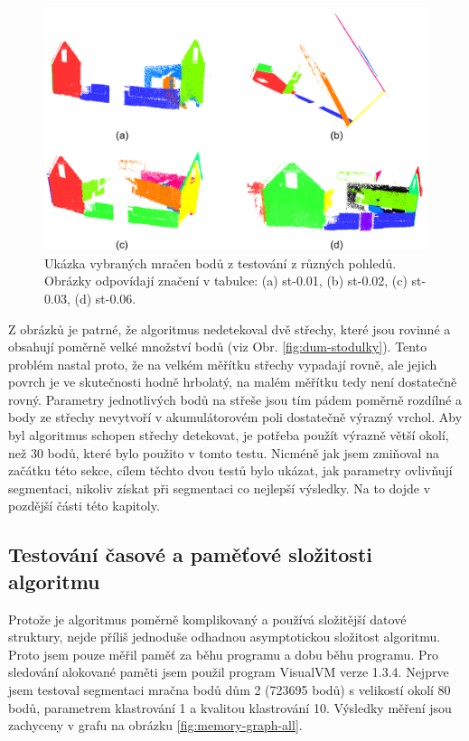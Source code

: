 \documentclass[11pt,twoside,a4paper]{book}
\begin{document}
\begin{figure}[ht]
\begin{center}
\includegraphics[width=\textwidth]{figures/test-stodulky-seg}
\caption{Ukázka vybraných mračen bodů z testování z různých pohledů. Obrázky odpovídají značení v tabulce: (a) st-0.01, (b) st-0.02, (c) st-0.03, (d) st-0.06.}
\label{fig:test-stodulky-seg}
\end{center}
\end{figure}

Z obrázků je patrné, že algoritmus nedetekoval dvě střechy, které jsou rovinné a obsahují poměrně velké množství bodů (viz Obr. \ref{fig:dum-stodulky}). Tento problém nastal proto, že na velkém měřítku střechy vypadají rovně, ale jejich povrch je ve skutečnosti hodně hrbolatý, na malém měřítku tedy není dostatečně rovný. Parametry jednotlivých bodů na střeše jsou tím pádem poměrně rozdílné a body ze střechy nevytvoří v akumulátorovém poli dostatečně výrazný vrchol. Aby byl algoritmus schopen střechy detekovat, je potřeba použít výrazně větší okolí, než 30 bodů, které bylo použito v tomto testu. Nicméně jak jsem zmiňoval na začátku této sekce, cílem těchto dvou testů bylo ukázat, jak parametry ovlivňují segmentaci, nikoliv získat při segmentaci co nejlepší výsledky. Na to dojde v pozdější části této kapitoly.


\newpage
\subsection{Testování časové a paměťové složitosti algoritmu}

Protože je algoritmus poměrně komplikovaný a používá složitější datové struktury, nejde příliš jednoduše odhadnou asymptotickou složitost algoritmu. Proto jsem pouze měřil paměť za běhu programu a dobu běhu programu. Pro sledování alokované paměti jsem použil program VisualVM verze 1.3.4. Nejprve jsem testoval  segmentaci mračna bodů dům 2 (723695 bodů) s velikostí okolí 80 bodů, parametrem klastrování 1 a kvalitou klastrování 10. Výsledky měření jsou zachyceny v grafu na obrázku \ref{fig:memory-graph-all}.
\end{document}
